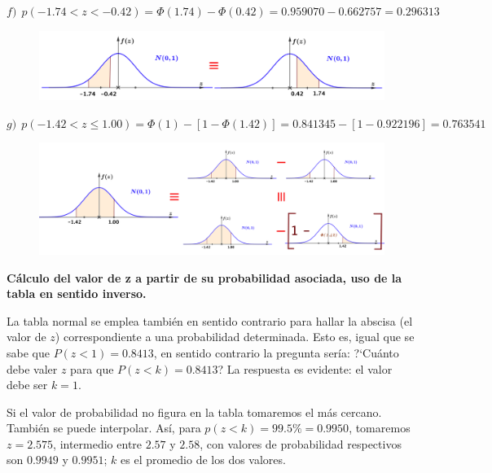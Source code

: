 \begin{ejemplo}
\begin{ejre}
$f)\ \ p(-1.74<z<-0.42)=\Phi(1.74)-\Phi(0.42)=0.959070-0.662757=0.296313$	
	\begin{figure}[H]
	\centering
	\includegraphics[width=1\textwidth]{imagenes/imagenes04/T04IM23.png}
	\end{figure}
	
	$g)\ \ p(-1.42<z\le 1.00)=\Phi(1)-[1-\Phi(1.42)]=0.841345-[1-0.922196]=0.763541$
	
	\begin{figure}[H]
	\centering
	\includegraphics[width=1\textwidth]{imagenes/imagenes04/T04IM24.png}
	\end{figure}
	
\end{ejre}
\end{ejemplo}


\vspace{10mm} %
\textbf{Cálculo del valor de z a partir de su probabilidad asociada, uso de la tabla en sentido inverso.}

La tabla normal se emplea también en sentido contrario para hallar la abscisa (el valor de $z$) correspondiente a una probabilidad determinada.  Esto es, igual que se sabe que $P(z< 1) = 0.8413$, en sentido contrario la pregunta sería:  ?`Cuánto debe valer $z$ para que $P(z<k)=0.8413$? La respuesta es evidente: el valor debe ser $k=1$.

Si el valor de probabilidad no figura en la tabla tomaremos el más cercano. 
También se puede  interpolar. Así, para $p(z<k)=99.5\%=0.9950$,  tomaremos $z = 2.575$, intermedio entre $2.57$ y $2.58$, con valores de probabilidad respectivos son $0.9949$ y $0.9951$; $k$ es el promedio de los dos valores.


